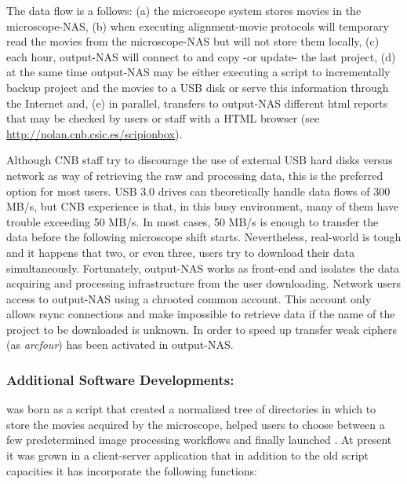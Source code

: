 The data flow is a follows: (a) the microscope system stores movies in the microscope-NAS, (b) when executing alignment-movie protocols \scipionbox will temporary read the movies from 
the microscope-NAS but will not store them locally, (c) each hour, output-NAS will connect to \scipionbox and copy -or update- the last \scipion project, (d) at the same time output-NAS may be either executing a script to incrementally backup \scipion project and the movies to a USB disk or serve this information through the Internet and, (e) in parallel, \scipionbox transfers to  output-NAS different html reports that may be checked by users or staff with a HTML browser (see \url{http://nolan.cnb.csic.es/scipionbox}).

Although CNB staff try to discourage the use of external USB hard disks versus network as way of retrieving the raw and processing data, this is the preferred option for most users.
USB 3.0 drives can theoretically handle data flows of 300 MB/s, but CNB experience is that, in this busy environment, many of them  have trouble exceeding 50 MB/s. In most cases, 50 MB/s is enough to transfer the data before the following microscope shift starts. Nevertheless, real-world is tough and it happens that two, or even three,  users try to download their data simultaneously. Fortunately, output-NAS works as front-end and isolates the data acquiring and processing infrastructure from the user downloading. Network users access to output-NAS using a chrooted common account. This account only allows rsync connections and make impossible to retrieve data if the name of the project to be downloaded is unknown. In order to speed up transfer weak ciphers (as \emph{arcfour}) has been activated in output-NAS.

\subsubsection{Additional Software Developments: \emadmin}

\emadmin was born as a script that created a normalized tree of directories  in which to store the movies acquired by the microscope, helped users to choose between a few predetermined image processing workflows and finally launched \scipion. At present it was grown in a client-server application that in addition to the old script capacities it has incorporate the following functions:

